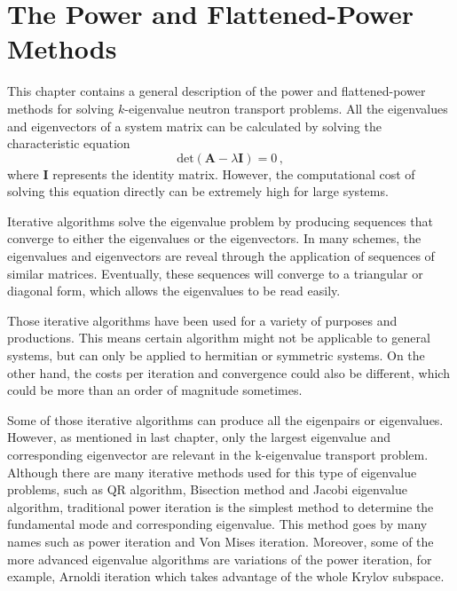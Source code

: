\cleardoublepage

\chapter{The Power and Flattened-Power Methods}
\label{chapter:PM}

This chapter contains a general description of the power and flattened-power methods for solving $k$-eigenvalue neutron transport problems.
All the eigenvalues and eigenvectors of a system matrix can be calculated by solving the characteristic equation
\begin{equation}
\text{det}(\mathbf{A} -\lambda \mathbf{I} ) = 0 \, ,
\label{eq:characteristic}
\end{equation}
where $\mathbf{I}$ represents the identity matrix.
However, the computational cost of solving this equation directly can be extremely high for large systems. 

Iterative algorithms solve the eigenvalue problem by producing sequences that converge to either the eigenvalues or the eigenvectors.
In many schemes, the eigenvalues and eigenvectors are reveal through the application of sequences of similar matrices. 
Eventually, these sequences will converge to a triangular or diagonal form, which allows the eigenvalues to be read easily. 

Those iterative algorithms have been used for a variety of purposes and productions.
This means certain algorithm might not be applicable to general systems, but can only be applied to hermitian or symmetric systems.
On the other hand, the costs per iteration and convergence could also be different, which could be more than an order of magnitude sometimes. 

Some of those iterative algorithms can produce all the eigenpairs or eigenvalues. 
However, as mentioned in last chapter, only the largest eigenvalue and corresponding eigenvector are relevant in the k-eigenvalue transport problem.
Although there are many iterative methods used for this type of eigenvalue problems, such as QR algorithm, Bisection method and Jacobi eigenvalue algorithm, traditional power iteration is the simplest method to determine the fundamental mode and corresponding eigenvalue.
This method goes by many names such as power iteration and Von Mises iteration\cite{mises1929praktische}.
Moreover, some of the more advanced eigenvalue algorithms are variations of the power iteration, for example, Arnoldi iteration \cite{arnoldi1951principle} which takes advantage of the whole Krylov subspace. 

